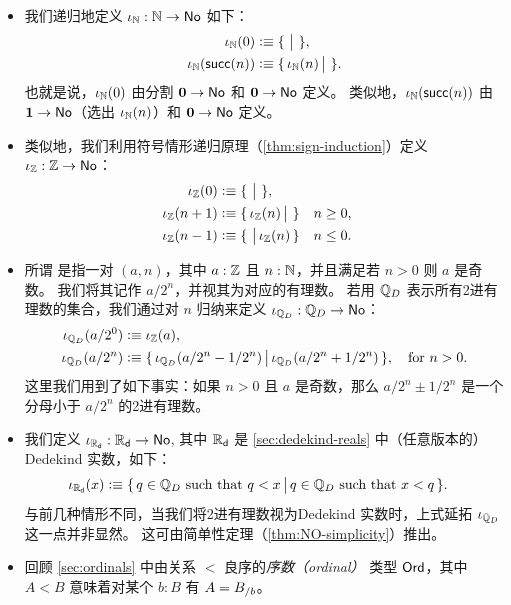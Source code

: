 \begin{itemize}
\item 我们递归地定义 $\iota_{\mathbb{N}}:\mathbb{N}\to\mathsf{No}$ 如下：
  \begin{align*}
    \iota_{\mathbb{N}}(0) &\vcentcolon\equiv \{\,\,\big|\,\,\},\\
    \iota_{\mathbb{N}}(\mathsf{succ}(n)) &\vcentcolon\equiv \{\,\iota_{\mathbb{N}}(n)\,\big|\,\,\}.
  \end{align*}
  也就是说，$\iota_{\mathbb{N}}(0)$ 由分割 $\mathbf{0}\to\mathsf{No}$ 和 $\mathbf{0}\to\mathsf{No}$ 定义。
  类似地，$\iota_{\mathbb{N}}(\mathsf{succ}(n))$ 由 $\mathbf{1}\to\mathsf{No}$（选出 $\iota_{\mathbb{N}}(n)$）和 $\mathbf{0}\to\mathsf{No}$ 定义。
\item 类似地，我们利用符号情形递归原理（\cref{thm:sign-induction}）定义 $\iota_{\mathbb{Z}}:\mathbb{Z}\to\mathsf{No}$：
  \begin{align*}
    \iota_{\mathbb{Z}}(0) &\vcentcolon\equiv \{\,\,\big|\,\,\},\\
    \iota_{\mathbb{Z}}(n+1) &\vcentcolon\equiv \{\,\iota_{\mathbb{Z}}(n)\,\big|\,\,\} & &\text{$n\ge 0$,}\\
    \iota_{\mathbb{Z}}(n-1) &\vcentcolon\equiv \{\,\,\big|\,\iota_{\mathbb{Z}}(n)\,\} & &\text{$n\le 0$.}
  \end{align*}
\item 所谓
  是指一对 $(a,n)$，其中 $a:\mathbb{Z}$ 且 $n:\mathbb{N}$，并且满足若 $n>0$ 则 $a$ 是奇数。
  我们将其记作 $a/2^n$，并视其为对应的有理数。
  若用 $\mathbb{Q}_D$ 表示所有2进有理数的集合，我们通过对 $n$ 归纳来定义 $\iota_{\mathbb{Q}_D}:\mathbb{Q}_D\to\mathsf{No}$：
  \begin{align*}
    \iota_{\mathbb{Q}_D}(a/2^0) &\vcentcolon\equiv \iota_{\mathbb{Z}}(a),\\
    \iota_{\mathbb{Q}_D}(a/2^n) &\vcentcolon\equiv \{\,\iota_{\mathbb{Q}_D}(a/2^n - 1/2^n)\,\big|\,\iota_{\mathbb{Q}_D}(a/2^n + 1/2^n)\,\},
    \quad \text{for $n>0$.}
  \end{align*}
  这里我们用到了如下事实：如果 $n>0$ 且 $a$ 是奇数，那么 $a/2^n \pm 1/2^n$ 是一个分母小于 $a/2^n$ 的2进有理数。
\item 我们定义 $\iota_{\mathbb{R}_\mathsf{d}}:\mathbb{R}_\mathsf{d}\to\mathsf{No}$,\label{reals-into-surreals} 其中 $\mathbb{R}_\mathsf{d}$ 是 \cref{sec:dedekind-reals} 中（任意版本的）Dedekind 实数，如下：
  \begin{align*}
    \iota_{\mathbb{R}_\mathsf{d}}(x) &\vcentcolon\equiv
    \{\,q\in\mathbb{Q}_D \text{ such that } q<x\,\big|\,q\in\mathbb{Q}_D \text{ such that } x<q\,\}.
  \end{align*}
  与前几种情形不同，当我们将2进有理数视为Dedekind 实数时，上式延拓 $\iota_{\mathbb{Q}_D}$ 这一点并非显然。
  这可由简单性定理（\cref{thm:NO-simplicity}）推出。
\item 回顾 \cref{sec:ordinals} 中由关系 $<$ 良序的\emph{序数（ordinal）} 类型 $\mathsf{Ord}$，其中 $A<B$ 意味着对某个 $b:B$ 有 $A = {B}_{/b}$。

\end{itemize}
